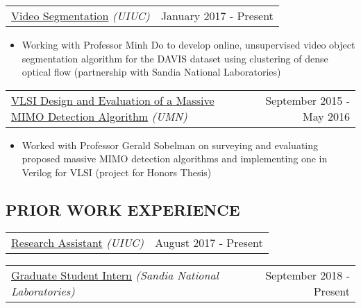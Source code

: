 \documentclass[10pt, letterpaper]{article}
\makeatletter
\newcommand{\headerrow}[2]
{\begin{tabular*}{\linewidth}{l@{\extracolsep{\fill}}r}
	#1 &
	#2 \\
\end{tabular*}}
\newcommand{\sansserif}{\cabin}
\makeatother
\begin{document}
\headerrow
	{\uline{Video Segmentation} \textit{(UIUC)}}
	{January 2017 - Present}
	\begin{itemize}
		\item
		Working with Professor Minh Do to develop online, unsupervised video object segmentation algorithm for the DAVIS dataset using clustering of dense optical flow (partnership with Sandia National Laboratories)	
	\end{itemize}

\headerrow
	{\uline{VLSI Design and Evaluation of a Massive MIMO Detection Algorithm} \textit{(UMN)}}
	{September 2015 - May 2016}
	\begin{itemize}
		\item
		Worked with Professor Gerald Sobelman on surveying and evaluating proposed massive MIMO detection algorithms and implementing one in Verilog for VLSI (project for Honors Thesis) 
	\end{itemize}


\subsection*{\sansserif PRIOR WORK EXPERIENCE}

\headerrow
	{\uline{Research Assistant} \textit{(UIUC)}}
	{August 2017 - Present}
	\begin{comment}
	\begin{itemize}
		\item Developed online algorithm for unsupervised video object segmentation based on clustering of dense optical flow
		\item Investigated real-time trackers based on discriminative correlation filters
        \item Developed RADAR-video fusion algorithms to generate high
resolution depth maps using electronically scanning RADAR (ESR) sensors found on
modern cars paired with video
	\end{itemize}
	\end{comment}
	\newline %
	
\headerrow
	{\uline{Graduate Student Intern} \textit{(Sandia National Laboratories)}}
	{September 2018 - Present}
	\begin{comment}
		\begin{itemize}
			\item Member of the Sensor Specific Processing team
				working on the transient detection pipeline
		\end{itemize}
	\end{comment}
	\newline
\end{document}
